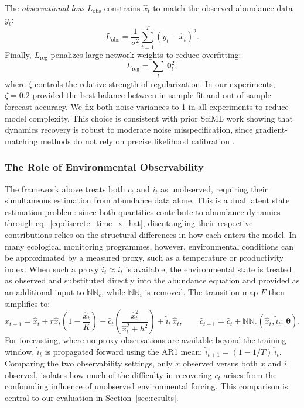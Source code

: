 \documentclass[openacc]{rsproca_new}%
\newcommand{\bs}[1]{\boldsymbol{#1}}
\begin{document}
The \textit{observational loss} $L_{\mathrm{obs}}$ constrains $\hat{x}_t$ to match the observed abundance data $y_t$:
%
\begin{equation}
    L_{\mathrm{obs}}
        = \frac{1}{\sigma^2} \sum_{t=1}^{T}
          \left(y_t - \hat{x}_t\right)^2.
    \label{eq:UDE_Lobs}
\end{equation}
%
Finally, $L_{\mathrm{reg}}$ penalizes large network weights to reduce overfitting:
%
\begin{equation}
    L_{\mathrm{reg}} = \sum_{l}\,\bs{\theta}_l^2,
    \label{eq:UDE_Lreg}
\end{equation}
%
where $\zeta$ controls the relative strength of regularization. In our experiments, $\zeta = 0.2$ provided the best balance between in-sample fit and out-of-sample forecast accuracy. We fix both noise variances to 1 in all experiments to reduce model complexity. This choice is consistent with prior SciML work showing that dynamics recovery is robust to moderate noise misspecification, since gradient-matching methods do not rely on precise likelihood calibration \parencite{treven2021}.
% 
\subsubsection*{The Role of Environmental Observability}
\label{sec:obs_variants}
The framework above treats both $c_t$ and $i_t$ as unobserved, requiring their simultaneous estimation from abundance data alone. This is a dual latent state estimation problem: since both quantities contribute to abundance dynamics through eq.~\eqref{eq:discrete_time_x_hat}, disentangling their respective contributions relies on the structural differences in how each enters the model.
% 
In many ecological monitoring programmes, however, environmental conditions can be approximated by a measured proxy, such as a temperature or productivity index.
When such a proxy $\tilde{i}_t \approx i_t$ is available, the environmental state is treated as observed and substituted directly into the abundance equation and provided as an additional input to $\mathbb{NN}_c$, while $\mathbb{NN}_i$ is removed. The transition map $F$ then simplifies to:
%
\begin{equation}
    \hat{x}_{t+1}
        = \hat{x}_t
        + r\hat{x}_t\!\left(1 - \frac{\hat{x}_t}{K}\right)
        - \hat{c}_t\!\left(\frac{\hat{x}_t^2}{\hat{x}_t^2 + h^2}\right)
        + \tilde{i}_t\,\hat{x}_t,
    \qquad
    \hat{c}_{t+1}
        = \hat{c}_t
        + \mathbb{NN}_c(\hat{x}_t, \tilde{i}_t;\,\bs{\theta}).
    \label{eq:F_obs}
\end{equation}
%
For forecasting, where no proxy observations are available beyond the
training window, $\hat{i}_t$ is propagated forward using the AR1 mean:
$\hat{i}_{t+1} = (1-1/T)\,\hat{i}_t$.
% 
Comparing the two observability settings, only $x$ observed versus both $x$ and $i$ observed, isolates how much of the difficulty in recovering $c_t$ arises from the confounding influence of unobserved environmental forcing. This comparison is central to our evaluation in Section~\ref{sec:results}.
% 
% 
\end{document}
